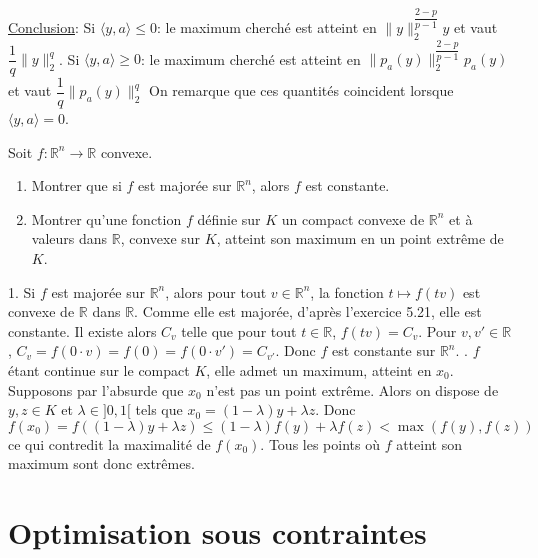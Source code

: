 \documentclass{fancybook}
\begin{document}
\underline{Conclusion}: \newline Si $\langle y,a \rangle\leq 0$: le maximum cherché est atteint en $\|y\|_2^{\dfrac{2-p}{p-1}}y$ et vaut $\dfrac{1}{q}\|y\|_2^q$.\newline
Si $\langle y,a \rangle\geq 0$: le maximum cherché est atteint en $\|p_a(y)\|_2^{\dfrac{2-p}{p-1}} p_a(y)$ et vaut $\dfrac{1}{q}\|p_a(y)\|_2^q$\newline
On remarque que ces quantités coincident lorsque $\langle y,a \rangle = 0$.

\begin{exercice}
Soit $f:\mathbb R^n\to \mathbb R$ convexe.
\begin{enumerate}
\item Montrer que si $f$ est majorée sur $\mathbb R^n$, alors $f$ est constante.
\item Montrer qu'une fonction $f$ définie sur $K$ un compact convexe de $\mathbb R^n$ et à valeurs dans $\mathbb R$, convexe sur $K$, atteint son maximum en un point extrême de $K$.
\end{enumerate}
\end{exercice}
1. Si $f$ est majorée sur $\mathbb R^n$, alors pour tout $v\in \mathbb R^n$, la fonction $t\mapsto f(tv)$ est convexe de $\mathbb R$ dans $\mathbb R$. Comme elle est majorée, d'après l'exercice 5.21, elle est constante. Il existe alors $C_v$ telle que pour tout $t\in \mathbb R$, $f(tv)=C_v$.\newline
Pour $v,v' \in \mathbb R$, $C_v=f(0\cdot v)=f(0)=f(0\cdot v')=C_{v'}$. Donc $f$ est constante sur $\mathbb R^n$. \newline
{}. $f$ étant continue sur le compact $K$, elle admet un maximum, atteint en $x_0$. Supposons par l'absurde que $x_0$ n'est pas un point extrême. Alors on dispose de $y,z\in K$ et $\lambda\in ]0,1[$ tels que $x_0=(1-\lambda)y + \lambda z$. Donc 
$$f(x_0)=f((1-\lambda)y + \lambda z)\leq (1-\lambda)f(y) + \lambda f(z) < \max(f(y),f(z))$$ ce qui contredit la maximalité de $f(x_0)$. \newline
Tous les points où $f$ atteint son maximum sont donc extrêmes.\newline


\newpage
\section{Optimisation sous contraintes}
\end{document}
